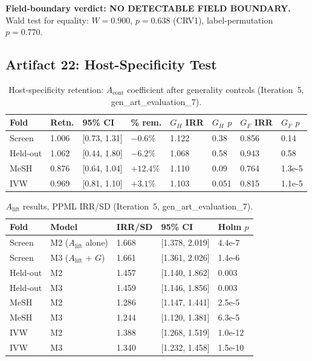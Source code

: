 \documentclass[11pt,letterpaper]{article}
\begin{document}
\textbf{Field-boundary verdict: NO DETECTABLE FIELD BOUNDARY.} Wald test for equality: $W = 0.900$, $p = 0.638$ (CRV1), label-permutation $p = 0.770$.

\subsection{Artifact 22: Host-Specificity Test}

\begin{table}[!htbp]
\centering
\caption{Host-specificity retention: $A_{\mathrm{cont}}$ coefficient after generality controls (Iteration~5, gen\_art\_evaluation\_7).}
\label{tab:host_specificity}
{\footnotesize\setlength{\tabcolsep}{3pt}
\begin{tabular}{lR{1.1cm}L{1.8cm}R{1.1cm}R{0.9cm}R{0.7cm}R{0.9cm}R{0.7cm}}
\toprule
Fold & Retn. & 95\% CI & \% rem. & $G_H$ IRR & $G_H$ $p$ & $G_F$ IRR & $G_F$ $p$ \\
\midrule
Screen & 1.006 & [0.73, 1.31] & $-0.6$\% & 1.122 & 0.38 & 0.856 & 0.14 \\
Held-out & 1.062 & [0.44, 1.80] & $-6.2$\% & 1.068 & 0.58 & 0.943 & 0.58 \\
MeSH & 0.876 & [0.64, 1.04] & $+12.4$\% & 1.110 & 0.09 & 0.764 & 1.3e-5 \\
IVW & 0.969 & [0.81, 1.10] & $+3.1$\% & 1.103 & 0.051 & 0.815 & 1.1e-5 \\
\bottomrule
\end{tabular}
}
\end{table}

\begin{table}[!htbp]
\centering
\caption{$A_{\mathrm{lift}}$ results, PPML IRR/SD (Iteration~5, gen\_art\_evaluation\_7).}
\label{tab:a_lift}
{\small
\begin{tabular}{llR{1.3cm}L{2.5cm}R{1.3cm}}
\toprule
Fold & Model & IRR/SD & 95\% CI & Holm $p$ \\
\midrule
Screen & M2 ($A_{\mathrm{lift}}$ alone) & 1.668 & [1.378, 2.019] & 4.4e-7 \\
Screen & M3 ($A_{\mathrm{lift}}$ + $G$) & 1.661 & [1.361, 2.026] & 1.4e-6 \\
Held-out & M2 & 1.457 & [1.140, 1.862] & 0.003 \\
Held-out & M3 & 1.459 & [1.146, 1.856] & 0.003 \\
MeSH & M2 & 1.286 & [1.147, 1.441] & 2.5e-5 \\
MeSH & M3 & 1.244 & [1.120, 1.381] & 6.3e-5 \\
IVW & M2 & 1.388 & [1.268, 1.519] & 1.0e-12 \\
IVW & M3 & 1.340 & [1.232, 1.458] & 1.5e-10 \\
\bottomrule
\end{tabular}
}
\end{table}
\end{document}
